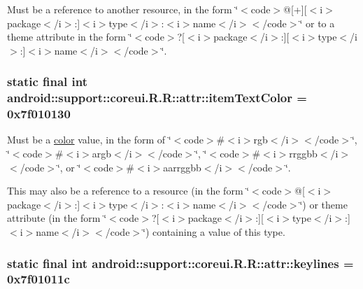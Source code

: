 Must be a reference to another resource, in the form \char`\"{}$<$code$>$@\mbox{[}+\mbox{]}\mbox{[}$<$i$>$package$<$/i$>$:\mbox{]}$<$i$>$type$<$/i$>$:$<$i$>$name$<$/i$>$$<$/code$>$\char`\"{} or to a theme attribute in the form \char`\"{}$<$code$>$?\mbox{[}$<$i$>$package$<$/i$>$:\mbox{]}\mbox{[}$<$i$>$type$<$/i$>$:\mbox{]}$<$i$>$name$<$/i$>$$<$/code$>$\char`\"{}. \hypertarget{classandroid_1_1support_1_1coreui_1_1_r_1_1attr_aa08732c564f374c235cec5553874b06}{
\subsubsection[{itemTextColor}]{\setlength{\rightskip}{0pt plus 5cm}static final int android::support::coreui.R.R::attr::itemTextColor = 0x7f010130}}
\label{classandroid_1_1support_1_1coreui_1_1_r_1_1attr_aa08732c564f374c235cec5553874b06}


Must be a \hyperlink{classandroid_1_1support_1_1coreui_1_1_r_1_1color}{color} value, in the form of \char`\"{}$<$code$>$\#$<$i$>$rgb$<$/i$>$$<$/code$>$\char`\"{}, \char`\"{}$<$code$>$\#$<$i$>$argb$<$/i$>$$<$/code$>$\char`\"{}, \char`\"{}$<$code$>$\#$<$i$>$rrggbb$<$/i$>$$<$/code$>$\char`\"{}, or \char`\"{}$<$code$>$\#$<$i$>$aarrggbb$<$/i$>$$<$/code$>$\char`\"{}. 

This may also be a reference to a resource (in the form \char`\"{}$<$code$>$@\mbox{[}$<$i$>$package$<$/i$>$:\mbox{]}$<$i$>$type$<$/i$>$:$<$i$>$name$<$/i$>$$<$/code$>$\char`\"{}) or theme attribute (in the form \char`\"{}$<$code$>$?\mbox{[}$<$i$>$package$<$/i$>$:\mbox{]}\mbox{[}$<$i$>$type$<$/i$>$:\mbox{]}$<$i$>$name$<$/i$>$$<$/code$>$\char`\"{}) containing a value of this type. \hypertarget{classandroid_1_1support_1_1coreui_1_1_r_1_1attr_3c19e4729664667d1911d3f50d7bdbd6}{
\subsubsection[{keylines}]{\setlength{\rightskip}{0pt plus 5cm}static final int android::support::coreui.R.R::attr::keylines = 0x7f01011c}}
\label{classandroid_1_1support_1_1coreui_1_1_r_1_1attr_3c19e4729664667d1911d3f50d7bdbd6}


